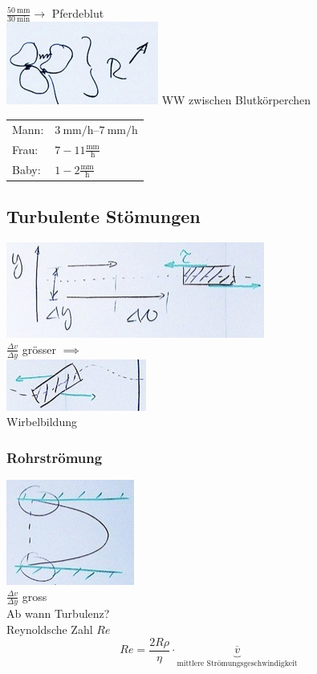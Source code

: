 $\frac{\SI{50}{\milli\metre}}{\SI{30}{\minute}} \rightarrow$ Pferdeblut \\
\includegraphics{Bild102} WW zwischen Blutkörperchen \\
\begin{tabular}{ l l }
	Mann: &$\SIrange{3}{7}{\milli\metre\per\hour}$ \\
	Frau: &$7 - 11 \frac{\text{mm}}{\text{h}}$ \\
	Baby: &$1 - 2 \frac{\text{mm}}{\text{h}}$
\end{tabular}

\subsection{Turbulente Stömungen}
\includegraphics{Bild103} \\
$\frac{\Delta v}{\Delta y}$ grösser $\implies$ \\
\includegraphics{Bild104} \\
Wirbelbildung

\subsubsection{Rohrströmung}
\includegraphics{Bild105} \\
$\frac{\Delta v}{\Delta y}$ gross \\
Ab wann Turbulenz? \\
Reynoldsche Zahl $Re$
\[ Re = \frac{2R\rho}{\eta} \cdot \underbrace{\overline{v}}_{\text{mittlere Strömungsgeschwindigkeit}} \]

